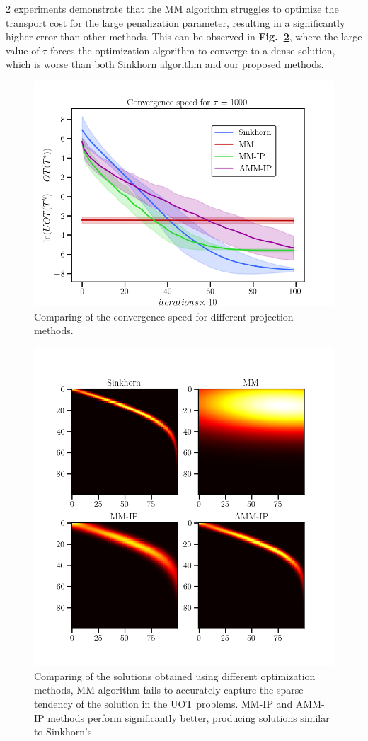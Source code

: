 2 experiments demonstrate that the MM algorithm struggles to optimize the transport cost for the large penalization parameter, resulting in a significantly higher error than other methods. This can be observed in {\bf Fig.~\ref{Fig:ex2}}, where the large value of $\tau$ forces the optimization algorithm to converge to a dense solution, which is worse than both Sinkhorn algorithm and our proposed methods.
\begin{figure}[t]
\centering
\includegraphics[width = 0.9\linewidth]{pic/ex1}
\caption{Comparing of the convergence speed for different projection methods.}
\label{Fig:ex1}
\end{figure}
\begin{figure}[t]
\centering
\includegraphics[width = 0.8\linewidth]{pic/ex2}
\setlength{\belowcaptionskip}{-10pt}
\caption{Comparing of the solutions obtained using different optimization methods, MM algorithm fails to accurately capture the sparse tendency of the solution in the UOT problems. MM-IP and AMM-IP methods perform significantly better, producing solutions similar to Sinkhorn's.}
\label{Fig:ex2}
\end{figure}

